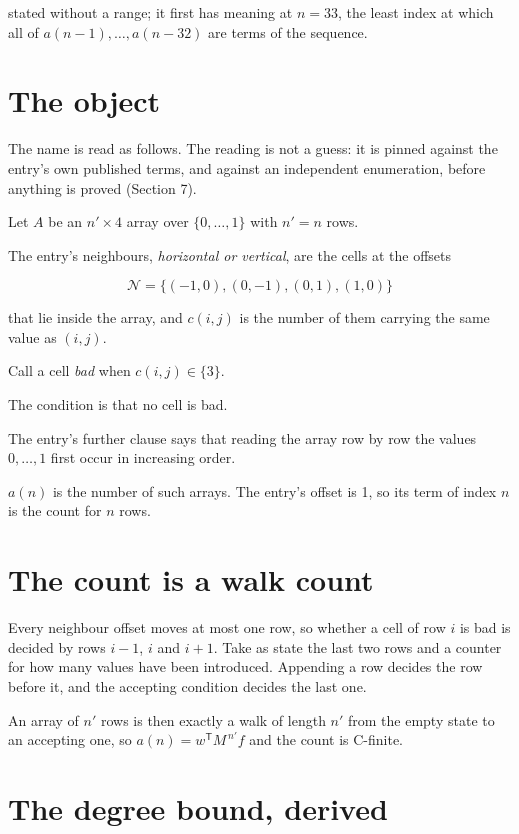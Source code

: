 \documentclass[11pt]{article}
\theoremstyle{definition}
\begin{document}
stated without a range; it first has meaning at $n = 33$, the least index at which all of $a(n-1),\dots,a(n-32)$ are terms of the sequence.

\section{The object}

The name is read as follows. The reading is not a guess: it is pinned against the entry's own published terms, and against an independent enumeration, before anything is proved (Section 7).

Let $A$ be an $n' \times 4$ array over $\{0,\dots,1\}$ with $n' = n$ rows.

The entry's neighbours, {\itshape horizontal or vertical}, are the cells at the offsets

\[\mathcal{N} = \{(-1,0), (0,-1), (0,1), (1,0)\}\]

that lie inside the array, and $c(i,j)$ is the number of them carrying the same value as $(i,j)$.

Call a cell {\itshape bad} when $c(i,j) \in \{3\}$.

The condition is that no cell is bad.

The entry's further clause says that reading the array row by row the values $0,\dots,1$ first occur in increasing order.

$a(n)$ is the number of such arrays. The entry's offset is 1, so its term of index $n$ is the count for $n$ rows.

\section{The count is a walk count}

Every neighbour offset moves at most one row, so whether a cell of row $i$ is bad is decided by rows $i-1$, $i$ and $i+1$. Take as state the last two rows and a counter for how many values have been introduced. Appending a row decides the row before it, and the accepting condition decides the last one.

An array of $n'$ rows is then exactly a walk of length $n'$ from the empty state to an accepting one, so $a(n) = w^{\mathsf T}M^{\,n'}f$ and the count is C-finite.

\section{The degree bound, derived}
\end{document}
